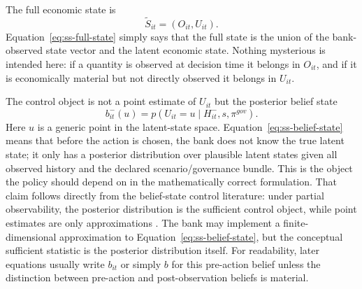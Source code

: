 \documentclass[11pt]{article}
\newcommand{\1}{\mathbf{1}}
\begin{document}
The full economic state is
\begin{equation}
  \widetilde S_{it} = (O_{it},U_{it}).
  \label{eq:ss-full-state}
\end{equation}
Equation~\eqref{eq:ss-full-state} simply says that the full state is the union
of the bank-observed state vector and the latent economic state. Nothing
mysterious is intended here: if a quantity is observed at decision time it
belongs in $O_{it}$, and if it is economically material but not directly
observed it belongs in $U_{it}$.

The control object is not a point estimate of $U_{it}$ but the posterior
belief state
\begin{equation}
  b^{-}_{it}(u)
  =
  p(U_{it}=u\mid H_{it}^{-},s,\pi^{gov}).
  \label{eq:ss-belief-state}
\end{equation}
Here $u$ is a generic point in the latent-state space. Equation~\eqref{eq:ss-belief-state}
means that before the action is chosen, the bank does not know the true latent
state; it only has a posterior distribution over plausible latent states given
all observed history and the declared scenario/governance bundle. This is the
object the policy should depend on in the mathematically correct formulation.
That claim follows directly from the belief-state control literature: under
partial observability, the posterior distribution is the sufficient control
object, while point estimates are only approximations
\citep{smallwood1973pomdp,kaelbling1998pomdp}.
The bank may implement a finite-dimensional approximation to
Equation~\eqref{eq:ss-belief-state}, but the conceptual sufficient statistic is
the posterior distribution itself.
For readability, later equations usually write $b_{it}$ or simply $b$ for this
pre-action belief unless the distinction between pre-action and post-observation
beliefs is material.
\end{document}
